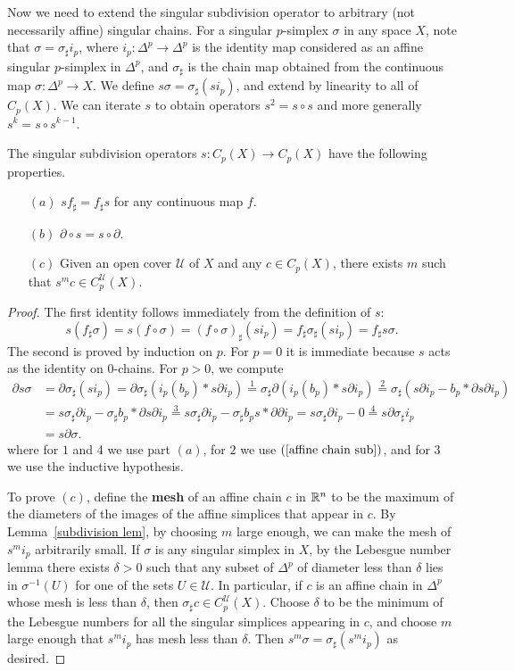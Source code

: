 Now we need to extend the singular subdivision operator to arbitrary (not necessarily affine) singular chains. For a singular $p$-simplex $\sigma$ in any space $X$, note that $\sigma=\sigma_\sharp i_p$, where $i_p:\Delta^p\to\Delta^p$ is the identity map considered as an affine singular $p$-simplex in $\Delta^p$, and $\sigma_\sharp$ is the chain map obtained from the continuous map $\sigma:\Delta^p\to X$. We define $s\sigma=\sigma_\sharp(si_p)$, and extend by linearity to all of $C_p(X)$. We can iterate $s$ to obtain operators $s^2=s\circ s$ and more generally $s^k=s\circ s^{k-1}$.
\begin{lemma}
The singular subdivision operators $s:C_p(X)\to C_p(X)$ have the following properties.
\begin{itemize}
\item[$(a)$]$sf_\sharp=f_\sharp s$ for any continuous map $f$.
\item[$(b)$]$\partial\circ s=s\circ\partial$.
\item[$(c)$]Given an open cover $\mathcal{U}$ of $X$ and any $c\in C_p(X)$, there exists $m$ such that $s^mc\in C^\mathcal{U}_p(X)$.
\end{itemize}
\end{lemma}
\begin{proof}
The first identity follows immediately from the definition of $s$:
\[s(f_\sharp\sigma)=s(f\circ\sigma)=(f\circ\sigma)_\sharp(si_p)=f_\sharp\sigma_\sharp(si_p)=f_\sharp s\sigma.\]
The second is proved by induction on $p$. For $p=0$ it is immediate because $s$ acts as the identity on $0$-chains. For $p>0$, we compute
\begin{align*}
\partial s\sigma&=\partial\sigma_\sharp(si_p)=\partial\sigma_\sharp(i_p(b_p)\ast s\partial i_p)\stackrel{1}{=}\sigma_\sharp\partial(i_p(b_p)\ast s\partial i_p)\stackrel{2}{=}\sigma_\sharp(s\partial i_p-b_p\ast\partial s\partial i_p)\\
&=s\sigma_\sharp\partial i_p-\sigma_\sharp b_p\ast\partial s\partial i_p\stackrel{3}{=}s\sigma_\sharp\partial i_p-\sigma_\sharp b_ps\ast\partial \partial i_p=s\sigma_\sharp\partial i_p-0\stackrel{4}{=}s\partial\sigma_\sharp i_p\\
&=s\partial\sigma.
\end{align*}
where for $1$ and $4$ we use part $(a)$, for $2$ we use $(\ref{affine chain sub})$, and for $3$ we use the inductive hypothesis.\par
To prove $(c)$, define the \textbf{mesh} of an affine chain $c$ in $\mathbb{R}^n$ to be the maximum of the diameters of the images of the affine simplices that appear in $c$. By Lemma~\ref{subdivision lem}, by choosing $m$ large enough, we can make the mesh of $s^mi_p$ arbitrarily small. If $\sigma$ is any singular simplex in $X$, by the Lebesgue number lemma there exists $\delta>0$ such that any subset of $\Delta^p$ of diameter less than $\delta$ lies in $\sigma^{-1}(U)$ for one of the sets $U\in\mathcal{U}$. In particular, if $c$ is an affine chain in $\Delta^p$ whose mesh is less than $\delta$, then $\sigma_\sharp c\in C_p^\mathcal{U}(X)$. Choose  $\delta$ to be the minimum of the Lebesgue numbers for all the singular simplices appearing in $c$, and choose $m$ large enough that $s^mi_p$ has mesh less than $\delta$. Then $s^m\sigma=\sigma_\sharp(s^mi_p)$ as desired.
\end{proof}
